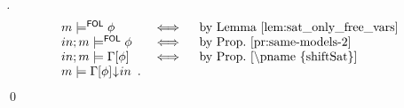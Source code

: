 \begin{proof}[]
\[\begin{array}{lll}
    m \sat^{\FOL} \phi & \iff & \text{ by Lemma~\ref{lem:sat_only_free_vars}}\\
    in;m \sat^{\FOL} \phi & \iff & \text{ by  Prop.~\ref{pr:same-models-2}}\\
    in;m \sat \abc{\phi} & \iff & \text{ by Prop.~\pref{shiftSat}}\\
    m \sat \shift{\abc{\phi}}{in} \enspace.
  \end{array}\]\qed
\end{proof}
  

